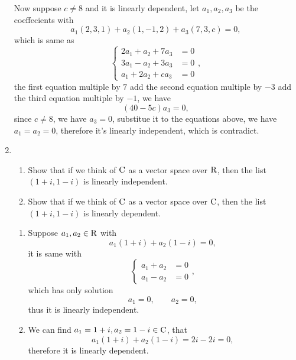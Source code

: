 \begin{enumerate}
\begin{solution}
            Now suppose $c \neq 8$ and it is linearly dependent, 
            let $a_1,a_2,a_3$ be the coeffecients with 
            \[ a_1(2,3,1) + a_2(1,-1,2) + a_3(7,3,c) = 0,\]
            which is same as 
            \[
                \begin{cases}
                    2a_1 + a_2 + 7a_3 &= 0 \\
                    3a_1 - a_2 + 3a_3 &= 0 \\
                    a_1 + 2a_2 + ca_3 &= 0
                \end{cases},
            \]
            the first equation multiple by $7$ add the second equation multiple by $-3$ add the third equation multiple by $-1$, we 
            have 
            \[ (40-5c)a_3 = 0, \]
            since $c \neq 8$, we have $a_3 = 0$, substitue it to the equations above, we have $a_1 = a_2 = 0$, therefore 
            it's linearly independent, which is contradict.
        \end{solution}
    \item \begin{enumerate}[label=(\alph*)]
            \item Show that if we think of $\mathrm{C}$ as a vector space over $\mathrm{R}$, then the list $(1+i, 1-i)$ is linearly independent.
            \item Show that if we think of $\mathrm{C}$ as a vector space over $\mathrm{C}$, then the list $(1+i, 1-i)$ is linearly dependent.
        \end{enumerate}
        \begin{solution}
            \begin{enumerate}[label=(\alph*)]
                \item Suppose $a_1, a_2 \in \mathrm{R}$ with 
                    \[ a_1 (1+i) + a_2 (1-i) = 0, \]
                    it is same with 
                    \[ 
                        \begin{cases}
                            a_1 + a_2 &= 0\\
                            a_1 - a_2 &= 0
                        \end{cases},
                    \]
                    which has only solution 
                    \[ a_1 = 0, \qquad a_2 = 0,\]
                    thus it is linearly independent.
                \item We can find $a_1 = 1+i, a_2 = 1-i \in \mathrm{C}$, that 
                    \[ a_1 (1+i) + a_2(1-i) = 2i - 2i = 0,\]
                    therefore it is linearly dependent.
            \end{enumerate}

\end{solution}
\end{enumerate}
